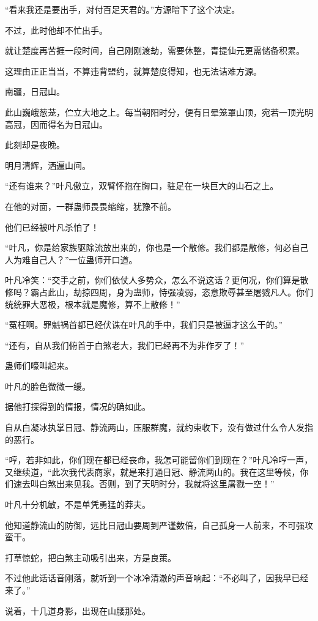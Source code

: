 \begin{this_body}
“看来我还是要出手，对付百足天君的。”方源暗下了这个决定。

不过，此时他却不忙出手。

就让楚度再苦捱一段时间，自己刚刚渡劫，需要休整，青提仙元更需储备积累。

这理由正正当当，不算违背盟约，就算楚度得知，也无法诘难方源。

南疆，日冠山。

此山巍峨葱茏，伫立大地之上。每当朝阳时分，便有日晕笼罩山顶，宛若一顶光明高冠，因而得名为日冠山。

此刻却是夜晚。

明月清辉，洒遍山间。

“还有谁来？”叶凡傲立，双臂怀抱在胸口，驻足在一块巨大的山石之上。

在他的对面，一群蛊师畏畏缩缩，犹豫不前。

他们已经被叶凡杀怕了！

“叶凡，你是给家族驱除流放出来的，你也是一个散修。我们都是散修，何必自己人为难自己人？”一位蛊师开口道。

叶凡冷笑：“交手之前，你们依仗人多势众，怎么不说这话？更何况，你们算是散修吗？霸占此山，劫掠四周，身为蛊师，恃强凌弱，恣意欺辱甚至屠戮凡人。你们统统罪大恶极，根本就是魔修，算不上散修！”

“冤枉啊。罪魁祸首都已经伏诛在叶凡的手中，我们只是被逼才这么干的。”

“还有，自从我们俯首于白煞老大，我们已经再不为非作歹了！”

蛊师们嚎叫起来。

叶凡的脸色微微一缓。

据他打探得到的情报，情况的确如此。

自从白凝冰执掌日冠、静流两山，压服群魔，就约束收下，没有做过什么令人发指的恶行。

“哼，若非如此，你们现在都已经丧命，我怎可能留你们到现在？”叶凡冷哼一声，又继续道，“此次我代表商家，就是来打通日冠、静流两山的。我在这里等候，你们速去叫白煞出来见我。否则，到了天明时分，我就将这里屠戮一空！”

叶凡十分机敏，不是单凭勇猛的莽夫。

他知道静流山的防御，远比日冠山要周到严谨数倍，自己孤身一人前来，不可强攻蛮干。

打草惊蛇，把白煞主动吸引出来，方是良策。

不过他此话话音刚落，就听到一个冰冷清澈的声音响起：“不必叫了，因我早已经来了。”

说着，十几道身影，出现在山腰那处。


\end{this_body}
